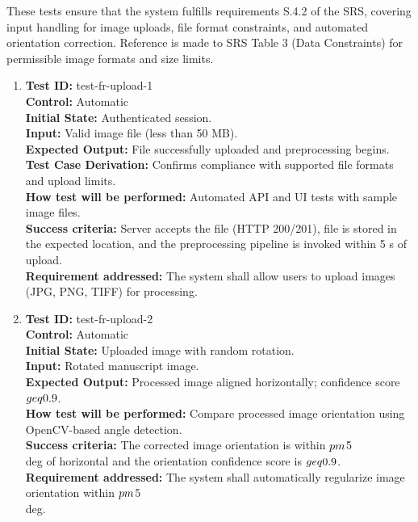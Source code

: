 \documentclass[12pt, titlepage]{article}
\begin{document}
These tests ensure that the system fulfills requirements S.4.2 of the SRS, covering input handling for image uploads, file format constraints, and automated orientation correction. Reference is made to SRS Table 3 (Data Constraints) for permissible image formats and size limits.

\begin{enumerate}
    \item
    \textbf{Test ID:} test-fr-upload-1\\
    \textbf{Control:} Automatic\\
    \textbf{Initial State:} Authenticated session.\\
    \textbf{Input:} Valid image file (less than 50 MB).\\
    \textbf{Expected Output:} File successfully uploaded and preprocessing begins.\\
    \textbf{Test Case Derivation:} Confirms compliance with supported file formats and upload limits.\\
    \textbf{How test will be performed:} Automated API and UI tests with sample image files.\\
    \textbf{Success criteria:} Server accepts the file (HTTP 200/201), file is stored in the expected location, and the preprocessing pipeline is invoked within 5 s of upload.\\
    \textbf{Requirement addressed:} The system shall allow users to upload images (JPG, PNG, TIFF) for processing.\\

    \item
    \textbf{Test ID:} test-fr-upload-2\\
    \textbf{Control:} Automatic\\
    \textbf{Initial State:} Uploaded image with random rotation.\\
    \textbf{Input:} Rotated manuscript image.\\
    \textbf{Expected Output:} Processed image aligned horizontally; confidence score $\\geq 0.9$.\\
    \textbf{How test will be performed:} Compare processed image orientation using OpenCV-based angle detection.\\
    \textbf{Success criteria:} The corrected image orientation is within $\\pm$5\\deg of horizontal and the orientation confidence score is $\\geq 0.9$.\\
    \textbf{Requirement addressed:} The system shall automatically regularize image orientation within $\\pm$5\\deg.\\
\end{enumerate}
\end{document}
